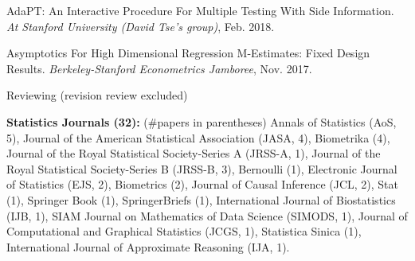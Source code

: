 \documentclass{article}
\begin{document}
\vspace{2mm}
AdaPT: An Interactive Procedure For Multiple Testing With Side Information. \emph{At Stanford University (David Tse's group)}, Feb. 2018.

\vspace{2mm}
Asymptotics For High Dimensional Regression M-Estimates: Fixed Design Results. \emph{Berkeley-Stanford Econometrics Jamboree}, Nov. 2017. 

\vspace{5mm}











\vspace{5mm}
\begin{large}
\noindent Reviewing (revision review excluded)
\end{large}

\vspace{2mm}
\noindent \textbf{Statistics Journals (32): }(\#papers in parentheses) Annals of Statistics (AoS, 5), Journal of the American Statistical Association (JASA, 4), Biometrika (4), Journal of the Royal Statistical Society-Series A (JRSS-A, 1), Journal of the Royal Statistical Society-Series B (JRSS-B, 3), Bernoulli (1), Electronic Journal of Statistics (EJS, 2), Biometrics (2), Journal of Causal Inference (JCL, 2), Stat (1), Springer Book (1), SpringerBriefs (1), International Journal of Biostatistics (IJB, 1), SIAM Journal on Mathematics of Data Science (SIMODS, 1), Journal of Computational and Graphical Statistics (JCGS, 1), Statistica Sinica (1), International Journal of Approximate Reasoning (IJA, 1).
\end{document}
